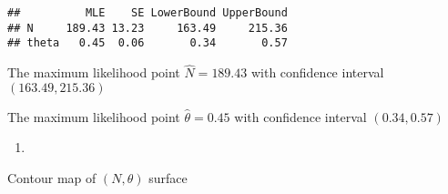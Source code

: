\documentclass[]{article}
\newenvironment{Shaded}{\begin{snugshade}}{\end{snugshade}}
\newcommand{\KeywordTok}[1]{\textcolor[rgb]{0.13,0.29,0.53}{\textbf{#1}}}
\newcommand{\DecValTok}[1]{\textcolor[rgb]{0.00,0.00,0.81}{#1}}
\newcommand{\FloatTok}[1]{\textcolor[rgb]{0.00,0.00,0.81}{#1}}
\newcommand{\StringTok}[1]{\textcolor[rgb]{0.31,0.60,0.02}{#1}}
\newcommand{\OperatorTok}[1]{\textcolor[rgb]{0.81,0.36,0.00}{\textbf{#1}}}
\newcommand{\NormalTok}[1]{#1}
\begin{document}
\begin{Shaded}
\end{Shaded}

\begin{verbatim}
##          MLE    SE LowerBound UpperBound
## N     189.43 13.23     163.49     215.36
## theta   0.45  0.06       0.34       0.57
\end{verbatim}

The maximum likelihood point \(\hat{N} = 189.43\) with confidence
interval \((163.49, 215.36)\)

The maximum likelihood point \(\hat{\theta} = 0.45\) with confidence
interval \((0.34, 0.57)\)

\begin{enumerate}
\def\labelenumi{\alph{enumi})}
\setcounter{enumi}{3}
\item
\end{enumerate}

Contour map of \((N, \theta)\) surface
\end{document}
